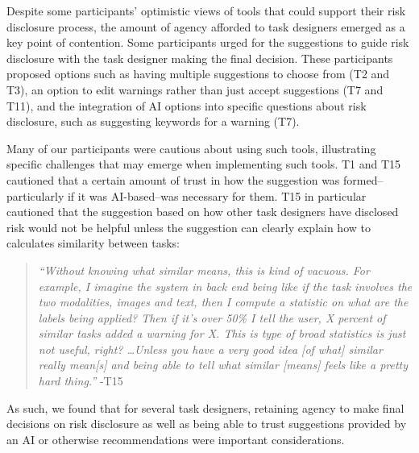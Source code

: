 Despite some participants' optimistic views of tools that could support their risk disclosure process, the amount of agency afforded to task designers emerged as a key point of contention. Some participants urged for the suggestions to guide risk disclosure with the task designer making the final decision. These participants proposed options such as having multiple suggestions to choose from (T2 and T3), an option to edit warnings rather than just accept suggestions (T7 and T11), and the integration of AI options into specific questions about risk disclosure, such as suggesting keywords for a warning (T7). 

Many of our participants were cautious about using such tools, illustrating specific challenges that may emerge when implementing such tools. T1 and T15 cautioned that a certain amount of trust in how the suggestion was formed--particularly if it was AI-based--was necessary for them. T15 in particular cautioned that the suggestion based on how other task designers have disclosed risk would not be helpful unless the suggestion can clearly explain how to calculates similarity between tasks: 
\begin{quote}
    \textit{``Without knowing what similar means, this is kind of vacuous. For example, I imagine the system in back end being like if the task involves the two modalities, images and text, then I compute a statistic on what are the labels being applied? Then if it's over 50\% I tell the user, X percent of similar tasks added a warning for X. This is type of broad statistics is just not useful, right? \dots Unless you have a very good idea [of what] similar really mean[s] and being able to tell what similar [means] feels like a pretty hard thing.''} -T15
\end{quote}
As such, we found that for several task designers, retaining agency to make final decisions on risk disclosure as well as being able to trust suggestions provided by an AI or otherwise recommendations were important considerations. 

